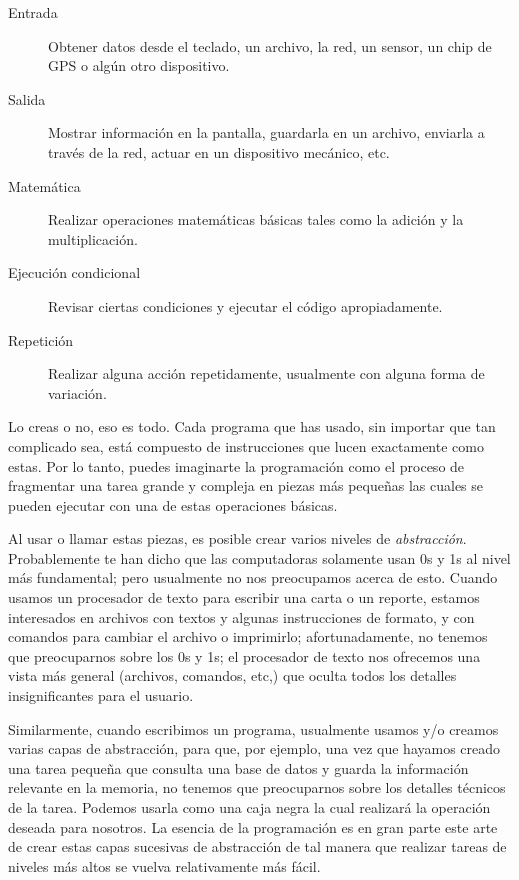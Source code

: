 \begin{description}

\item[Entrada] Obtener datos desde el teclado, un archivo, la red, 
un sensor, un chip de GPS o algún otro dispositivo.

\item[Salida] Mostrar información en la pantalla, guardarla en un archivo,
 enviarla a través de la red, actuar en un dispositivo mecánico,  etc.

\item[Matemática] Realizar operaciones matemáticas básicas tales como la adición y
la multiplicación.

\item[Ejecución condicional] Revisar ciertas condiciones y ejecutar el código 
apropiadamente.

\item[Repetición] Realizar alguna acción repetidamente, usualmente con alguna
forma de variación.

\end{description}

Lo creas o no, eso es todo. Cada programa que has usado, sin importar
que tan complicado sea, está compuesto de instrucciones que lucen exactamente
como estas. Por lo tanto, puedes imaginarte la programación como el 
proceso de fragmentar una tarea grande y compleja en piezas más pequeñas
las cuales se pueden ejecutar con una de estas operaciones básicas.

Al usar o llamar estas piezas, es posible crear varios niveles
de \emph{abstracción}. Probablemente te han dicho que las computadoras
solamente usan 0s y 1s al nivel más fundamental; pero usualmente no 
nos preocupamos acerca de esto. Cuando usamos un procesador de texto para
escribir una carta o un reporte, estamos interesados en archivos con textos
y algunas instrucciones de formato, y con comandos para cambiar el archivo o
imprimirlo; afortunadamente, no tenemos que preocuparnos sobre los 0s y 1s; el
procesador de texto nos ofrecemos una vista más general (archivos, comandos, etc,)
que oculta todos los detalles insignificantes para el usuario. 


Similarmente, cuando escribimos un programa, 
usualmente usamos y/o creamos varias capas de abstracción, 
para que, por ejemplo, una vez que hayamos creado una tarea pequeña 
que consulta una base de datos y guarda la información relevante
en la memoria, no tenemos que preocuparnos sobre los detalles técnicos
de la tarea. Podemos usarla como una caja negra la cual realizará 
la operación deseada para nosotros. La esencia de la programación es 
en gran parte este arte de crear estas capas sucesivas de abstracción 
de tal manera que realizar tareas de niveles más altos se vuelva 
relativamente más fácil.


